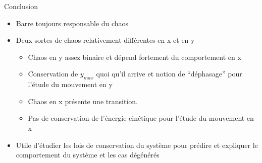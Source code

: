 \documentclass{beamer}
\begin{document}
  \begin{frame}{Conclusion}
  \begin{itemize}
    \item Barre toujours responsable du chaos
    \item Deux sortes de chaos relativement différentes en x et en y
    \begin{itemize}
      \item Chaos en y assez binaire et dépend fortement du comportement en x
      \item Conservation de \(y_{max}\) quoi qu'il arrive et notion de ``déphasage'' pour l'étude du mouvement en y
      \item Chaos en x présente une transition.
      \item Pas de conservation de l'énergie cinétique pour l'étude du mouvement en x
    \end{itemize}
    \item Utile d'étudier les lois de conservation du système pour prédire et expliquer le comportement du système et les cas dégénérés
  \end{itemize}
  \begin{center}
  {}
  \end{center}
  \end{frame}
  
\end{document}
